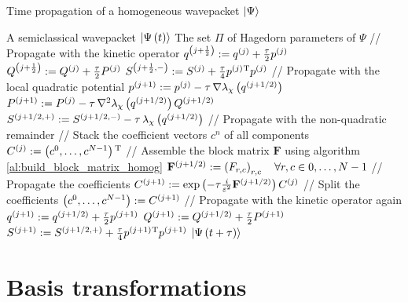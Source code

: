 \begin{algorithm}
\caption{Time propagation of a homogeneous wavepacket $\Ket{\Psi}$}
\label{al:tp_wave_packets_homog}
\begin{algorithmic}
  \REQUIRE A semiclassical wavepacket $\Ket{\Psi\left( t \right)}$
  \REQUIRE The set $\Pi$ of Hagedorn parameters of $\Psi$
  \STATE // Propagate with the kinetic operator
  \STATE $q^{\left(j+\frac{1}{2}\right)} := q^{\left(j\right)} + \frac{\tau}{2} p^{\left(j\right)}$
  \STATE $Q^{\left(j+\frac{1}{2}\right)} := Q^{\left(j\right)} + \frac{\tau}{2} P^{\left(j\right)}$
  \STATE $S^{\left(j+\frac{1}{2},-\right)} := S^{\left(j\right)} + \frac{\tau}{4} p^{\left(j\right)}{}^{\textnormal{T}} p^{\left(j\right)}$
  \STATE // Propagate with the local quadratic potential
  \STATE $p^{\left(j+1\right)} := p^{\left(j\right)} - \tau \, \nabla \lambda_\chi\left( q^{\left(j+1/2\right)} \right)$
  \STATE $P^{\left(j+1\right)} := P^{\left(j\right)} - \tau \, \nabla^2 \lambda_\chi\left( q^{\left(j+1/2\right)} \right) Q^{\left(j+1/2\right)}$
  \STATE $S^{\left(j+1/2,+\right)} := S^{\left(j+1/2,-\right)} - \tau \, \lambda_\chi\left( q^{\left(j+1/2\right)} \right)$
  \STATE // Propagate with the non-quadratic remainder
  \STATE // Stack the coefficient vectors $c^n$ of all components
  \STATE $C^{\left(j\right)} := \left(c^0, \hdots, c^{N-1}\right){}^{\textnormal{T}}$
  \STATE // Assemble the block matrix $\mathbf{F}$ using algorithm \ref{al:build_block_matrix_homog}
  \STATE $\mathbf{F}^{\left(j+1/2\right)} := \left(F_{r,c}\right)_{r,c} \quad \forall r,c \in 0,\ldots,N-1$
  \STATE // Propagate the coefficients
  \STATE $C^{\left(j+1\right)} := \exp\left( -\tau \frac{i}{\varepsilon^2} \mathbf{F}^{\left(j+1/2\right)} \right) C^{\left(j\right)}$
  \STATE // Split the coefficients
  \STATE $\left(c^0, \ldots, c^{N-1}\right) := C^{\left(j+1\right)}$
  \STATE // Propagate with the kinetic operator again
  \STATE $q^{\left(j+1\right)} := q^{\left(j+1/2\right)} + \frac{\tau}{2} p^{\left(j+1\right)}$
  \STATE $Q^{\left(j+1\right)} := Q^{\left(j+1/2\right)} + \frac{\tau}{2} P^{\left(j+1\right)}$
  \STATE $S^{\left(j+1\right)} := S^{\left(j+1/2,+\right)} + \frac{\tau}{4} p^{\left(j+1\right)}{}^{\textnormal{T}} p^{\left(j+1\right)}$
  \RETURN $\Ket{\Psi\left( t+\tau \right)}$
\end{algorithmic}
\end{algorithm}

\section{Basis transformations}
\label{sec:basis_transformation_hagedorn}

